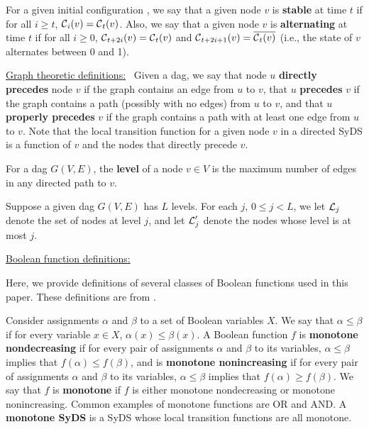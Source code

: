 For a given initial configuration \calc{},
we  say that a given node $v$ is \textbf{stable} at time $t$ if
for all $i \geq t$, $\mbox{$\mathcal{C}$}_i(v)= \mbox{$\mathcal{C}$}_t(v)$.
Also, we say that a given node $v$ is \textbf{alternating} at time $t$ if
for all $i \geq 0$, 
$\mbox{$\mathcal{C}$}_{t+2i}(v) =  \mbox{$\mathcal{C}$}_t(v)$ 
and $\mbox{$\mathcal{C}$}_{t+2i+1}(v) = \overline{ \mbox{$\mathcal{C}$}_t(v)}$ 
(i.e., the state of $v$ alternates between 0 and 1).  


\smallskip
\noindent
\underline{\textsf{Graph theoretic definitions:}}~
Given a dag, we say that node $u$ {\bf directly precedes}
node $v$ if the graph contains an edge from $u$ to $v$,
that $u$ {\bf precedes} $v$ if the graph contains a path (possibly
with no edges) from $u$ to $v$,
and that $u$ {\bf properly precedes} $v$
if the graph contains a path with at least one edge  from $u$ to $v$.
Note that the local transition function for a given node $v$  in a
directed SyDS is a function of $v$
and the nodes that directly precede $v$.

\begin{definition}\label{def:dag_level}
For a dag $G(V,E)$, 
the \textbf{level} of a node $v \in V$ is the maximum number
of edges in any directed path to $v$.
\end{definition}

Suppose a given dag $G(V,E)$ has $L$ levels. 
For each $j$, $0 \leq j < L$, we let $\mbox{$\mathcal{L}$}_j$ denote the set of nodes at level $j$,
and let $\mbox{$\mathcal{L}$}_j'$ denote the nodes whose level is at most $j$.

\smallskip
\noindent
\underline{\textsf{Boolean function definitions:}}~
\iffalse
A {\bf linear} Boolean function is one that can be expressed as a
linear equation mod 2 of its variables, i.e., the xor or complement
of the xor of its variables.  A {\bf linear SyDS} is a SyDS whose
local transition functions are all linear.
\fi
Here, we provide definitions of several classes of
Boolean functions used in this paper.
These definitions are from \cite{Crama-Hammer-2011,BH+06}.  

Consider assignments $\alpha$ and $\beta$
to a set of Boolean variables $X$.  We say that $\alpha \leq \beta$
if for every variable $x \in X$, $\alpha(x) \leq \beta(x)$.  A
Boolean function $f$  is {\bf monotone nondecreasing} if for every
pair of assignments $\alpha$ and $\beta$ to its variables, $\alpha
\leq \beta$ implies that $f(\alpha) \leq f(\beta)$, and is {\bf
monotone nonincreasing} if for every pair of assignments $\alpha$
and $\beta$ to its variables, $\alpha \leq \beta$ implies that
$f(\alpha) \geq f(\beta)$.  We say that $f$ is {\bf monotone} if
$f$ is either monotone nondecreasing or monotone nonincreasing. 
Common examples of monotone functions are OR and AND.
A {\bf monotone SyDS} is a SyDS whose local transition functions are
all monotone.

